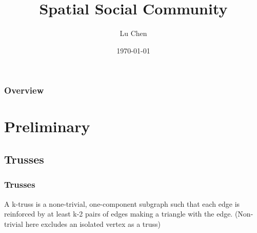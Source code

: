 \documentclass{beamer}
\title[S.S.C]{Spatial Social Community} %
\author{Lu Chen} %
\institute[FSET] %
{
Swinburne University of Technology \\ %
\medskip
\textit{luchen@swin.edu.au} %
}
\date{\today} %
\begin{document}
\begin{frame}
\titlepage %
\end{frame}

\begin{frame}
\frametitle{Overview} %
\tableofcontents %
\end{frame}


\section{Preliminary} %
\subsection{Trusses} %

\begin{frame}
\frametitle{Trusses}
\begin{definition}
A k-truss is a none-trivial, one-component subgraph such that each edge is reinforced by at least k-2 pairs of edges making a triangle with the edge. (Non-trivial here excludes an isolated vertex as a truss)
\end{definition}
\end{frame}

\end{document}
